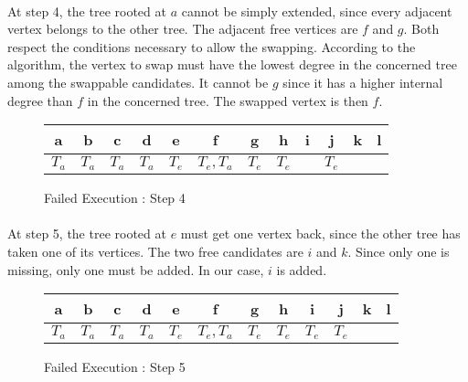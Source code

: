\paragraph{}
At step 4, the tree rooted at $a$ cannot be simply extended, since every
adjacent vertex belongs to the other tree. The adjacent free vertices are $f$ and
$g$. Both respect the conditions necessary to allow the swapping. According to
the algorithm, the vertex to swap must have the lowest degree in the concerned
tree among the swappable candidates. It cannot be $g$ since it has a higher
internal degree than $f$ in the concerned tree. The swapped vertex is then $f$.

\begin{figure}[H]
  \caption{Failed Execution : Step 4}
  \begin{center}
    \begin{tikzpicture}[scale=0.9,transform shape]
      
    \end{tikzpicture}
    \begin{tabular}{|c|c|c|c|c|c|c|c|c|c|c|c|}
\hline
a & b & c & d & e & f & g & h & i & j & k & l\\
\hline
$T_a$ & $T_a$ & $T_a$ & $T_a$ & $T_e$ & $T_e, T_a$ & $T_e$ & $T_e$ & & $T_e$ & &\\
\hline
    \end{tabular}
  \end{center}
\end{figure}

\paragraph{}
At step 5, the tree rooted at $e$ must get one vertex back, since the other
tree has taken one of its vertices. The two free candidates are $i$ and $k$.
Since only one is missing, only one must be added. In our case, $i$ is added.

\begin{figure}[H]
  \caption{Failed Execution : Step 5}
  \begin{center}
    \begin{tikzpicture}[scale=0.9,transform shape]
      
    \end{tikzpicture}
    \begin{tabular}{|c|c|c|c|c|c|c|c|c|c|c|c|}
\hline
a & b & c & d & e & f & g & h & i & j & k & l\\
\hline
$T_a$ & $T_a$ & $T_a$ & $T_a$ & $T_e$ & $T_e, T_a$ & $T_e$ & $T_e$ & $T_e$ & $T_e$ & &\\
\hline
    \end{tabular}
  \end{center}
\end{figure}

